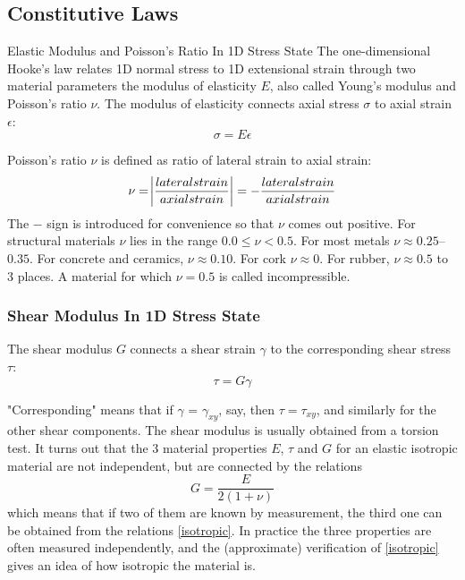 


\subsection{Constitutive Laws}

Elastic Modulus and Poisson's Ratio In 1D Stress State
The one-dimensional Hooke’s law relates 1D normal stress to 1D extensional strain through two material parameters the modulus of elasticity $E$, also called Young's modulus and Poisson's ratio $\nu$. The modulus of elasticity connects axial stress $\sigma$ to axial strain $\epsilon$:
\begin{equation}
\sigma = E\epsilon \label{Hooke's law}
\end{equation}

Poisson's ratio $\nu$ is defined as ratio of lateral strain to axial strain:
\begin{equation}
\nu = \abs{\frac{lateral strain}{axial strain}} = -\frac{lateral strain}{axial strain}
\end{equation}
The $-$ sign is introduced for convenience so that $\nu$ comes out positive. For structural materials $\nu$ lies in the range $0.0 \leq \nu <0.5$. For most metals $\nu \approx 0.25$–$0.35$. For concrete and ceramics, $\nu \approx 0.10$. For cork $\nu \approx 0$. For rubber, $\nu \approx 0.5$ to 3 places. A material for which $\nu = 0.5$ is called incompressible.

\subsubsection{Shear Modulus In 1D Stress State}

The shear modulus $G$ connects a shear strain $\gamma$ to the corresponding shear stress $\tau$:
\begin{equation}
\tau = G\gamma \label{Bulk modulus}
\end{equation} 

"Corresponding" means that if $\gamma$ = $\gamma_{xy}$, say, then $\tau = \tau_{xy}$, and similarly for the other shear components. The shear modulus is usually obtained from a torsion test. It turns out that the 3 material properties $E$, $\tau$ and $G$ for an elastic isotropic material are not independent, but are connected by the relations
\begin{equation}
G = \frac{E}{2(1 + \nu)} \label{isotropic}
\end{equation}
which means that if two of them are known by measurement, the third one can be obtained from the relations \ref{isotropic}. In practice the three properties are often measured independently, and the (approximate) verification of \ref{isotropic} gives an idea of how isotropic the material is.


